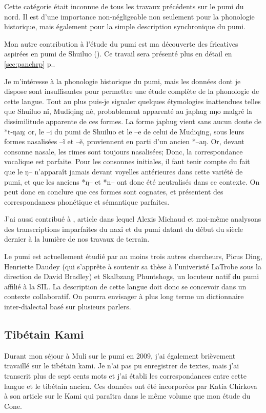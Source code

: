 \documentclass[oldfontcommands,oneside,a4paper,11pt]{memoir}
\newcommand{\ipa}[1]{{\phon #1}} %
\begin{document}
Cette catégorie était inconnue de tous les travaux précédents sur le pumi du nord. Il est d'une importance non-négligeable non seulement pour la phonologie historique, mais également pour la simple description synchronique du pumi.

Mon autre contribution à l'étude du pumi est ma découverte des fricatives aspirées en pumi de Shuiluo (\citealt{jacques11lingua}). Ce travail sera présenté plus en détail en \ref{sec:panchrp} p.\pageref{sec:panchrp}.

Je m'intéresse à la phonologie historique du pumi, mais les données dont je dispose sont insuffisantes pour permettre une étude complète de la phonologie de cette langue. Tout au plus puis-je signaler quelques étymologies inattendues telles que Shuiluo \ipa{nî}, Mudiqing \ipa{nê}, probablement apparenté au japhug \ipa{nŋo} malgré la dissimilitude apparente de ces formes. La forme japhug vient sans aucun doute  de *t-ŋaŋ; or, le --i du pumi de Shuiluo et le --e de celui de Mudiqing, sous leurs formes nasalisées --ĩ et --ẽ, proviennent en parti d'un ancien *--aŋ. Or, devant consonne nasale, les rimes sont toujours nasalisées; Donc, la correspondance vocalique est parfaite. Pour les consonnes initiales, il faut tenir compte du fait que le ŋ-- n'apparaît jamais devant voyelles antérieures dans cette variété de pumi, et que les anciens *ŋ-- et *n-- ont donc été neutralisés dans ce contexte. On peut donc en conclure que ces formes sont cognates, et présentent des correspondances phonétique et sémantique parfaites.

J'ai aussi contribué à \citet{michaud10bonin}, article dans lequel Alexis Michaud et moi-même analysons des transcriptions imparfaites du naxi et du pumi datant du début du siècle dernier à la lumière de nos travaux de terrain.
 


Le pumi est actuellement étudié par au moins trois autres chercheurs, Picus Ding, Henriette Daudey (qui s'apprête à soutenir sa thèse à l'univeristé LaTrobe sous la direction de David Bradley) et Skalbzang Phuntshogs, un locuteur natif  du pumi affilié à la SIL. La description de cette langue doit donc se concevoir dans un contexte collaboratif. On pourra envisager à plus long terme un dictionnaire inter-dialectal basé sur plusieurs parlers. 

\subsection{Tibétain Kami}
Durant mon séjour à Muli sur le pumi en 2009, j'ai également brièvement travaillé sur le tibétain kami. Je n'ai pas pu enregistrer de textes, mais j'ai transcrit plus de sept cents mots et j'ai établi les correspondances entre cette langue et le tibétain ancien. Ces données ont été incorporées par Katia Chirkova à son article sur le Kami qui paraîtra dans le même volume que mon étude du Cone.
\end{document}
